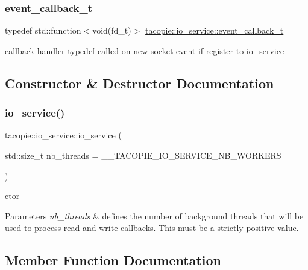 \subsubsection{\texorpdfstring{event\+\_\+callback\+\_\+t}{event\_callback\_t}}
{\footnotesize\ttfamily typedef std\+::function$<$void(fd\+\_\+t)$>$ \hyperlink{classtacopie_1_1io__service_abb66850c32d9c724f4418d77bd04bcfd}{tacopie\+::io\+\_\+service\+::event\+\_\+callback\+\_\+t}}

callback handler typedef called on new socket event if register to \hyperlink{classtacopie_1_1io__service}{io\+\_\+service} 

\subsection{Constructor \& Destructor Documentation}
\mbox{\label{classtacopie_1_1io__service_a62edde9b62571610413d99d075df8102}} 
\subsubsection{\texorpdfstring{io\+\_\+service()}{io\_service()}}
{\footnotesize\ttfamily tacopie\+::io\+\_\+service\+::io\+\_\+service (\begin{DoxyParamCaption}\item[{std\+::size\+\_\+t}]{nb\+\_\+threads = {\ttfamily \+\_\+\+\_\+TACOPIE\+\_\+IO\+\_\+SERVICE\+\_\+NB\+\_\+WORKERS} }\end{DoxyParamCaption})}

ctor


\begin{DoxyParams}{Parameters}
{\em nb\+\_\+threads} & defines the number of background threads that will be used to process read and write callbacks. This must be a strictly positive value. \\
\hline
\end{DoxyParams}


\subsection{Member Function Documentation}
\mbox{\label{classtacopie_1_1io__service_a7e2b0700c0a4591f86c344df8748b3a5}} 

